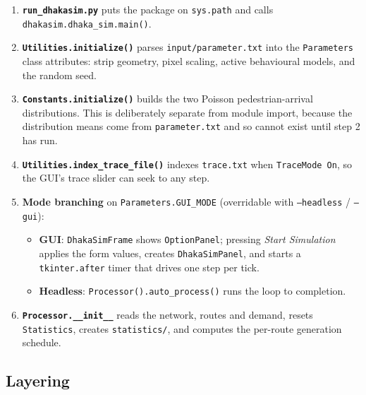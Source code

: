\documentclass[11pt, a4paper]{article}
\newcommand{\code}[1]{\texttt{#1}}
\begin{document}
\begin{enumerate}
    \item \textbf{\code{run\_dhakasim.py}} puts the package on \code{sys.path}
          and calls \code{dhakasim.dhaka\_sim.main()}.
    \item \textbf{\code{Utilities.initialize()}} parses
          \code{input/parameter.txt} into the \code{Parameters} class
          attributes: strip geometry, pixel scaling, active behavioural models,
          and the random seed.
    \item \textbf{\code{Constants.initialize()}} builds the two Poisson
          pedestrian-arrival distributions. This is deliberately separate from
          module import, because the distribution means come from
          \code{parameter.txt} and so cannot exist until step 2 has run.
    \item \textbf{\code{Utilities.index\_trace\_file()}} indexes
          \code{trace.txt} when \code{TraceMode On}, so the GUI's trace slider
          can seek to any step.
    \item \textbf{Mode branching} on \code{Parameters.GUI\_MODE} (overridable
          with \code{--headless} / \code{--gui}):
    \begin{itemize}
        \item \textbf{GUI}: \code{DhakaSimFrame} shows \code{OptionPanel};
              pressing \emph{Start Simulation} applies the form values, creates
              \code{DhakaSimPanel}, and starts a \code{tkinter.after} timer that
              drives one step per tick.
        \item \textbf{Headless}: \code{Processor().auto\_process()} runs the loop
              to completion.
    \end{itemize}
    \item \textbf{\code{Processor.\_\_init\_\_}} reads the network, routes and
          demand, resets \code{Statistics}, creates \code{statistics/}, and
          computes the per-route generation schedule.
\end{enumerate}

\subsection{Layering}
\end{document}
